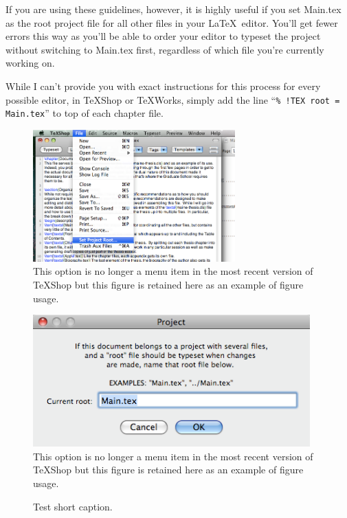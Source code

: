 If you are using these guidelines, however, it is highly useful if you set Main.tex as the root project file for all other files in your \LaTeX\ editor.  You'll get fewer errors this way as you'll be able to order your editor to typeset the project without switching to Main.tex first, regardless of which file you're currently working on.

While I can't provide you with exact instructions for this process for every possible editor, in TeXShop or TeXWorks, simply add the line ``\verb|% !TEX root =  Main.tex|'' to top of each chapter file.

\begin{figure}
\includegraphics[height=2in]{Figures/ProjectRoot}
\caption[``Set Project Root...'' option in the File menu for TeXShop.]{This option is no longer a menu item in the most recent version of TeXShop but this figure is retained here as an example of figure usage.}
\label{rootmenu}
\end{figure}

\begin{figure}
\includegraphics[height=2in]{Figures/Dialog}
\caption[``Set Project Root...'' dialog for \TeX Shop.]{This option is no longer a menu item in the most recent version of \TeX Shop but this figure is retained here as an example of figure usage.}
\label{rootdialog}
\end{figure}

\begin{figure}
\caption{Test short caption.}
\end{figure}

